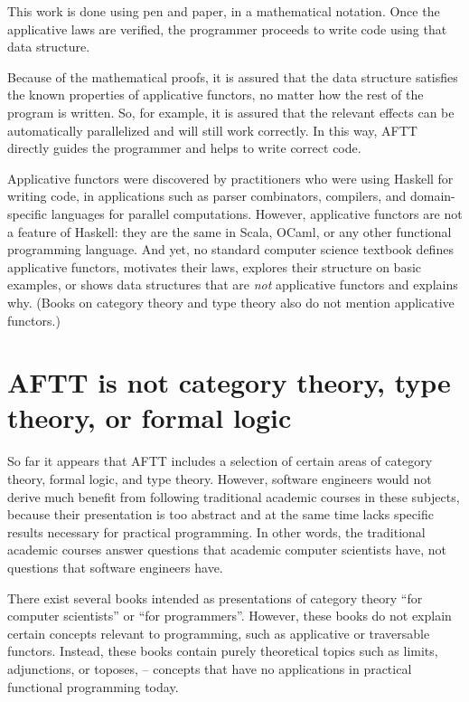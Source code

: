 This work is done using pen and paper, in a mathematical notation.
Once the applicative laws are verified, the programmer proceeds to
write code using that data structure.

Because of the mathematical proofs, it is assured that the data structure
satisfies the known properties of applicative functors, no matter
how the rest of the program is written. So, for example, it is assured
that the relevant effects can be automatically parallelized and will
still work correctly. In this way, AFTT directly guides the programmer
and helps to write correct code.

Applicative functors were discovered by practitioners who were using
Haskell for writing code, in applications such as parser combinators,
compilers, and domain-specific languages for parallel computations.
However, applicative functors are not a feature of Haskell: they are
the same in Scala, OCaml, or any other functional programming language.
And yet, no standard computer science textbook defines applicative
functors, motivates their laws, explores their structure on basic
examples, or shows data structures that are \emph{not} applicative
functors and explains why. (Books on category theory and type theory
also do not mention applicative functors.)

\section{AFTT is not category theory, type theory, or formal logic}

So far it appears that AFTT includes a selection of certain areas
of category theory, formal logic, and type theory. However, software
engineers would not derive much benefit from following traditional
academic courses in these subjects, because their presentation is
too abstract and at the same time lacks specific results necessary
for practical programming. In other words, the traditional academic
courses answer questions that academic computer scientists have, not
questions that software engineers have.

There exist several books intended as presentations of category theory
``for computer scientists'' or ``for programmers''. However, these
books do not explain certain concepts relevant to programming, such
as applicative or traversable functors. Instead, these books contain
purely theoretical topics such as limits, adjunctions, or toposes,
– concepts that have no applications in practical functional programming
today.

